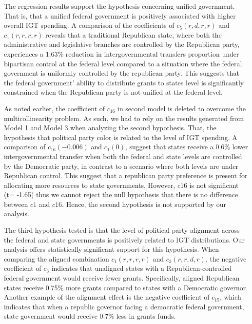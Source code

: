 The regression results support the hypothesis concerning unified government. That is, that a unified federal government is positively associated with higher overall IGT spending. A comparison of the coefficients of $c_5(r, d, r, r)$ and $c_1(r, r, r, r)$ reveals that a traditional Republican state, where both the administrative and legislative branches are controlled by the Republican party, experiences a 1.63\% reduction in intergovernmental transfers proportion under bipartisan control at the federal level compared to a
situation where the federal government is uniformly controlled by the republican party. This suggests that the federal government' ability to distribute grants to states level is significantly constrained when the Republican party is not unified at the federal level.


As noted earlier, the coefficient of $c_{16}$ in second model is deleted to overcome the multicollinearity problem. As such, we had to rely on the results generated from Model 1 and Model 3 when analyzing the second hypothesis. That, the hypothesis that political party color is related to the level of IGT spending.  A comparison of $c_{16}(-0.006)$ and $c_1(0)$, suggest that states
receive a 0.6\% lower intergovernmental transfer when both the federal and state levels are controlled by the Democratic party, in contrast to a scenario where both levels are under Republican control. This suggest that a republican party preference is present for allocating more resources to state governments. However, $c16$ is not significant (t= -1.65) thus we cannot reject the null
hypothesis that there is no difference between $c1$ and $c16$. Hence, the second hypothesis is not supported by our analysis.


The third hypothesis tested is that the level of political party alignment across the federal and state governments is positively related to IGT distributions. Our analysis offers statistically significant support for this hypothesis. When comparing the aligned combination $c_1(r, r, r, r)$ and $c_3(r, r, d, r)$, the negative coefficient of $c_3$ indicates that unaligned states with a Republican-controlled federal government would receive fewer grants. Specifically, aligned Republican states receive 0.75\% more grants compared to states with a Democratic governor. Another example of the alignment effect is the negative coefficient of $c_{15}$, which indicates that when a republic governor facing a democratic federal government, state government would receive 0.7\% less in grants funds.


